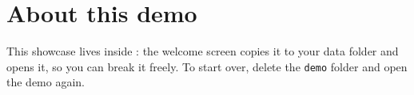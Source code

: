 \chapter{About this demo}
\label{app:demo}

This showcase lives inside \rutex{}: the welcome screen copies it to your data
folder and opens it, so you can break it freely. To start over, delete the
\texttt{demo} folder and open the demo again.
